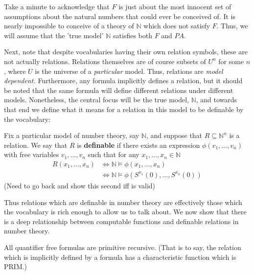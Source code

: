 Take a minute to acknowledge that $F$ is just about the most innocent set of assumptions about the natural numbers that could ever be conceived of. It is nearly impossible to conceive of a theory of $\mathbb{N}$ which does not satisfy $F$. Thus, we will assume that the 'true model' $\mathbb{N}$ satisfies both $F$ and $PA$.
\par Next, note that despite vocabularies having their own relation symbols, these are not actually relations. Relations themselves are of course subsets of $U^n$ for some $n$, where $U$ is the universe of a \textit{particular} model. Thus, relations are \textit{model dependent.} Furthermore, any formula implicitly defines a relation, but it should be noted that the same formula will define different relations under different models. Nonetheless, the central focus will be the true model, $\mathbb{N}$, and towards that end we define what it means for a relation in this model to be definable by the vocabulary:
\begin{definition}
    Fix a particular model of number theory, say $\mathbb{N}$, and suppose that $R \subseteq \mathbb{N}^n$ is a relation. We say that $R$ is \textbf{definable} if there exists an expression $\phi(v_1,...,v_n)$ with free variables $v_1,...,v_n$ such that for any $x_1,...,x_n \in \mathbb{N}$ 
    \begin{align}
        R(x_1,...,x_n) &\iff \mathbb{N} \models \phi(x_1,...,x_n) \\
                       & \iff \mathbb{N} \models \phi(S^{x_1}(0),...,S^{x_n}(0))
    \end{align}
    (Need to go back and show this second iff is valid)
\end{definition}
Thus relations which are definable in number theory are effectively those which the vocabulary is rich enough to allow us to talk about. We now show that there is a deep relationship between computable functions and definable relations in number theory. 
\begin{theorem}
    All quantifier free formulas are primitive recursive. (That is to say, the relation which is implicitly defined by a formula has a characteristic function which is PRIM.)
\end{theorem}
